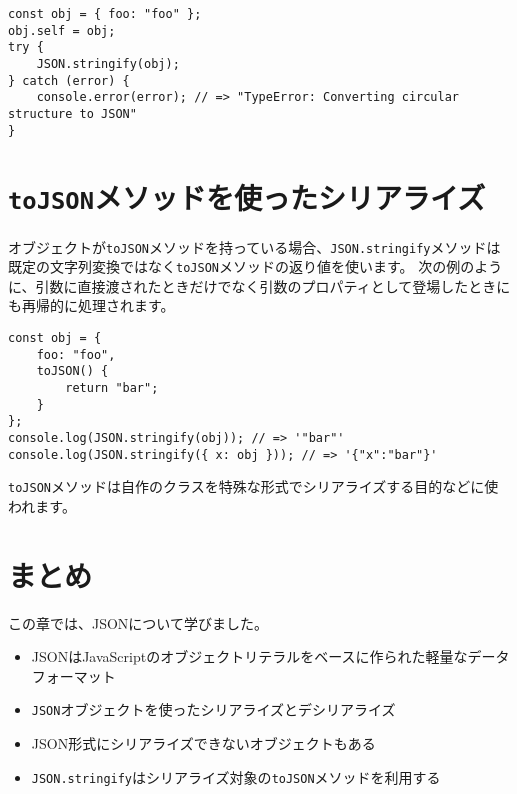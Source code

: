 \begin{lstlisting}
const obj = { foo: "foo" };
obj.self = obj;
try {
    JSON.stringify(obj);
} catch (error) {
    console.error(error); // => "TypeError: Converting circular structure to JSON"
}
\end{lstlisting}

\hypertarget{serialization-by-toJSON}{%
\section{\texorpdfstring{\texttt{toJSON}メソッドを使ったシリアライズ}{toJSONメソッドを使ったシリアライズ}}\label{serialization-by-toJSON}}

オブジェクトが\texttt{toJSON}メソッドを持っている場合、\texttt{JSON.stringify}メソッドは既定の文字列変換ではなく\texttt{toJSON}メソッドの返り値を使います。
次の例のように、引数に直接渡されたときだけでなく引数のプロパティとして登場したときにも再帰的に処理されます。

\begin{lstlisting}
const obj = {
    foo: "foo",
    toJSON() {
        return "bar";
    }
};
console.log(JSON.stringify(obj)); // => '"bar"'
console.log(JSON.stringify({ x: obj })); // => '{"x":"bar"}'
\end{lstlisting}

\texttt{toJSON}メソッドは自作のクラスを特殊な形式でシリアライズする目的などに使われます。

\hypertarget{conclusion}{%
\section{まとめ}\label{conclusion}}

この章では、JSONについて学びました。

\begin{itemize}
\item
  JSONはJavaScriptのオブジェクトリテラルをベースに作られた軽量なデータフォーマット
\item
  \texttt{JSON}オブジェクトを使ったシリアライズとデシリアライズ
\item
  JSON形式にシリアライズできないオブジェクトもある
\item
  \texttt{JSON.stringify}はシリアライズ対象の\texttt{toJSON}メソッドを利用する
\end{itemize}
